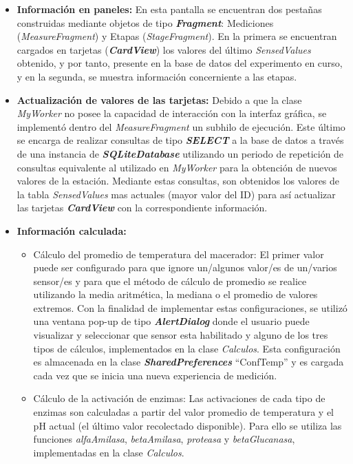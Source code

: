\begin{itemize}
                \item\textbf{ Información en paneles:} En esta pantalla se encuentran dos pestañas construidas mediante objetos de tipo \textbf{\textit{\gls{Fragment}}}: Mediciones (\textit{MeasureFragment}) y Etapas (\textit{StageFragment}). En la primera se encuentran cargados en tarjetas (\textbf{\textit{\gls{CardView}}}) los valores del último \textit{SensedValues} obtenido, y por tanto, presente en la base de datos del experimento en curso, y en la segunda, se muestra información concerniente a las etapas.
                
                \item \textbf{Actualización de valores de las tarjetas:} Debido a que la clase \textit{MyWorker} no posee la capacidad de interacción con la interfaz gráfica, se implementó dentro del \textit{MeasureFragment} un subhilo de ejecución. Este último se encarga de realizar consultas de tipo \textbf{\textit{\gls{SELECT}}} a la base de datos a través de una instancia de \textbf{\textit{\gls{SQLiteDatabase}}} utilizando un periodo de repetición de consultas equivalente al utilizado en \textit{MyWorker} para la obtención de nuevos valores de la estación. Mediante estas consultas, son obtenidos los valores de la tabla \textit{SensedValues} mas actuales (mayor valor del ID) para así actualizar las tarjetas \textbf{\textit{\gls{CardView}}} con la correspondiente información.
                
                \item \textbf{Información calculada:}
                \begin{itemize}
                    \item Cálculo del promedio de temperatura del macerador: El primer valor puede ser configurado para que ignore un/algunos valor/es de un/varios sensor/es y para que el método de cálculo de promedio se realice utilizando la media aritmética, la mediana o el promedio de valores extremos. Con la finalidad de implementar estas configuraciones, se utilizó una ventana pop-up de tipo \textbf{\textit{\gls{AlertDialog}}} donde el usuario puede visualizar y seleccionar que sensor esta habilitado y alguno de los tres tipos de cálculos, implementados en la clase \textit{Calculos}. Esta configuración es almacenada en la clase \textbf{\textit{SharedPreferences}} ``ConfTemp'' y es cargada cada vez que se inicia una nueva experiencia de medición. 
                
                    \item Cálculo de la activación de enzimas: Las activaciones de cada tipo de enzimas son calculadas a partir del valor promedio de temperatura y el pH actual (el último valor recolectado disponible). Para ello se utiliza las funciones \textit{alfaAmilasa}, \textit{betaAmilasa}, \textit{proteasa} y \textit{betaGlucanasa}, implementadas en la clase \textit{Calculos}. 
                

\end{itemize}
\end{itemize}
